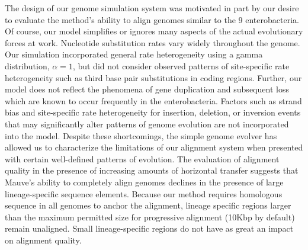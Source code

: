 \documentclass[titlepage,11pt]{article}
\begin{document}
The design of our genome simulation system was motivated in part by our desire
to evaluate the method's ability to align genomes similar to the 9
enterobacteria.  Of course, our model simplifies or ignores many aspects of
the actual evolutionary forces at work.  Nucleotide substitution rates vary
widely throughout the genome.  Our simulation incorporated general
rate heterogeneity using a gamma distribution, $\alpha = 1$, but did not consider observed
patterns of site-specific rate heterogeneity such as third base pair
substitutions in coding regions.  Further, our model does not reflect the
phenomena of gene duplication and subsequent loss which are known to occur
frequently in the enterobacteria.  Factors such as strand bias and
site-specific rate heterogeneity for insertion, deletion, or inversion events
that may significantly alter patterns of genome evolution are not incorporated
into the model.  Despite these shortcomings, the simple genome evolver has
allowed us to characterize the limitations of our alignment system when
presented with certain well-defined patterns of evolution.  The evaluation of
alignment quality in the presence of increasing amounts of horizontal transfer
suggests that Mauve's ability to completely align genomes declines in the
presence of large lineage-specific sequence elements.  Because our method
requires homologous sequence in all genomes to anchor the alignment, lineage
specific regions larger than the maximum permitted size for progressive
alignment (10Kbp by default) remain unaligned.  Small lineage-specific regions
do not have as great an impact on alignment quality.



\end{document}
